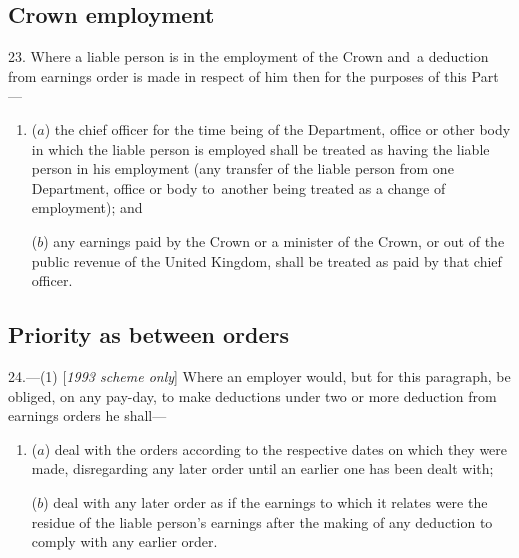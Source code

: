 \documentclass[12pt,a4paper]{article}
\begin{document}

\subsection[23. Crown employment]{Crown employment}

23.  Where a liable person is in the employment of the Crown and~a deduction from earnings order is made in respect of him then for the purposes of this Part—
\begin{enumerate}\item[]
($a$) the chief officer for the time being of the Department, office or other body in which the liable person is employed shall be treated as having the liable person in his employment (any transfer of the liable person from one Department, office or body to~another being treated as a change of employment); and

($b$) any earnings paid by the Crown or a minister of the Crown, or out of the public revenue of the United Kingdom, shall be treated as paid by that chief officer.
\end{enumerate}

\subsection[24. Priority as between orders]{Priority as between orders}

24.—(1) [\emph{1993 scheme only}] Where an employer would, but for this paragraph, be obliged, on any pay-day, to make deductions under two or more deduction from earnings orders he shall—
\begin{enumerate}\item[]
($a$) deal with the orders according to the respective dates on which they were made, disregarding any later order until an earlier one has been dealt with;

($b$) deal with any later order as if the earnings to which it relates were the residue of the liable person’s earnings after the making of any deduction to comply with any earlier order.
\end{enumerate}
\end{document}
